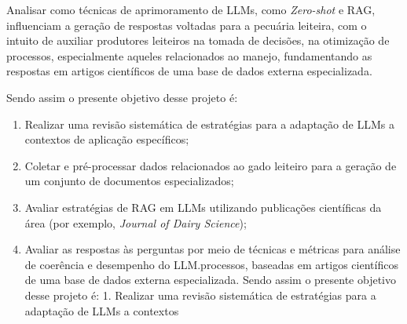 Analisar como técnicas de aprimoramento de LLMs, como \textit{Zero-shot} \cite{zero-shot} e RAG, influenciam a geração de respostas voltadas para a pecuária leiteira, com o intuito de auxiliar produtores leiteiros na tomada de decisões, na otimização de processos, especialmente aqueles relacionados ao manejo, fundamentando as respostas em artigos científicos de uma base de dados externa especializada.

Sendo assim o presente objetivo desse projeto é:

\begin{enumerate}
\item Realizar uma revisão sistemática de estratégias para a adaptação de LLMs a contextos de aplicação específicos;
\item Coletar e pré-processar dados relacionados ao gado leiteiro para a geração de um conjunto de documentos especializados;
\item Avaliar estratégias de RAG em LLMs utilizando publicações científicas da área (por exemplo, \textit{Journal of Dairy Science});
\item Avaliar as respostas às perguntas por meio de técnicas e métricas para análise de coerência e desempenho do LLM.processos, baseadas em artigos científicos de uma base de dados externa especializada.
Sendo assim o presente objetivo desse projeto é:
1. Realizar uma revisão sistemática de estratégias para a adaptação de LLMs a contextos

\end{enumerate}